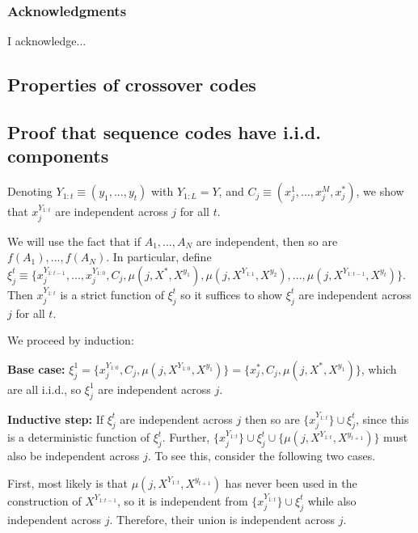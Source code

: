 \documentclass{article}
\begin{document}
\subsubsection*{Acknowledgments}

I acknowledge...


  

\begin{appendices}
\section{Properties of crossover codes}

\subsection{Proof that sequence codes have i.i.d. components}

Denoting $Y_{1:t} \equiv (y_1, ..., y_t)$ with $Y_{1:L} = Y$, and $C_j \equiv (x^1_j, ..., x^M_j, x^*_j)$, we show that $x_j^{Y_{1:t}}$ are independent across $j$ for all $t$.

We will use the fact that if $A_1, ..., A_N$ are independent, then so are $f(A_1), ..., f(A_N)$. In particular, define $\xi^t_j \equiv \{x_j^{Y_{1:t-1}}, ..., x_j^{Y_{1:0}}, C_j, \mu(j, X^*, X^{y_1}), \mu(j, X^{Y_{1:1}}, X^{y_2}), ..., \mu(j, X^{Y_{1:t-1}}, X^{y_t})\}$. Then $x_j^{Y_{1:t}}$ is a strict function of $\xi^t_j$ so it suffices to show $\xi^t_j$ are independent across $j$ for all $t$.

We proceed by induction:

\textbf{Base case:} $\xi^1_j = \{x^{Y_{1:0}}_j, C_j, \mu(j, X^{Y_{1:0}}, X^{y_1})\} = \{x^*_j, C_j, \mu(j, X^*, X^{y_1})\}$, which are all i.i.d., so $\xi^1_j$ are independent across $j$.

\textbf{Inductive step:} If $\xi^t_j$ are independent across $j$ then so are $\{x_j^{Y_{1:t}}\} \cup \xi^t_j$, since this is a deterministic function of $\xi^t_j$. Further, $\{x_j^{Y_{1:t}}\} \cup \xi^t_j \cup \{\mu(j, X^{Y_{1:t}}, X^{y_{t+1}})\}$ must also be independent across $j$. To see this, consider the following two cases.

First, most likely is that $\mu(j, X^{Y_{1:t}}, X^{y_{t+1}})$ has never been used in the construction of $X^{Y_{1:t-1}}$, so it is independent from $\{x_j^{Y_{1:t}}\} \cup \xi^t_j$ while also independent across $j$. Therefore, their union is independent across $j$.


\end{appendices}
\end{document}
